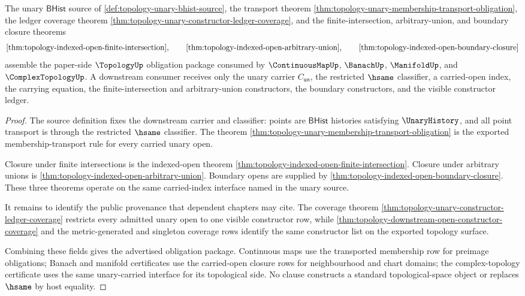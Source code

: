 \begin{theorem}
\label{thm:topology-deps-ready-obligation-package}
The unary $\mathsf{BHist}$ source of \autoref{def:topology-unary-bhist-source}, the transport theorem \autoref{thm:topology-unary-membership-transport-obligation}, the ledger coverage theorem \autoref{thm:topology-unary-constructor-ledger-coverage}, and the finite-intersection, arbitrary-union, and boundary closure theorems
$$
\autoref{thm:topology-indexed-open-finite-intersection},\qquad
\autoref{thm:topology-indexed-open-arbitrary-union},\qquad
\autoref{thm:topology-indexed-open-boundary-closure}
$$
assemble the paper-side $\TopologyUp$ obligation package consumed by $\ContinuousMapUp$, $\BanachUp$, $\ManifoldUp$, and $\ComplexTopologyUp$. A downstream consumer receives only the unary carrier $C_{\mathsf{un}}$, the restricted $\hsame$ classifier, a carried-open index, the carrying equation, the finite-intersection and arbitrary-union constructors, the boundary constructors, and the visible constructor ledger.
\end{theorem}
\begin{proof}
The source definition fixes the downstream carrier and classifier: points are $\mathsf{BHist}$ histories satisfying $\UnaryHistory$, and all point transport is through the restricted $\hsame$ classifier. The theorem \autoref{thm:topology-unary-membership-transport-obligation} is the exported membership-transport rule for every carried unary open.

Closure under finite intersections is the indexed-open theorem \autoref{thm:topology-indexed-open-finite-intersection}. Closure under arbitrary unions is \autoref{thm:topology-indexed-open-arbitrary-union}. Boundary opens are supplied by \autoref{thm:topology-indexed-open-boundary-closure}. These three theorems operate on the same carried-index interface named in the unary source.

It remains to identify the public provenance that dependent chapters may cite. The coverage theorem \autoref{thm:topology-unary-constructor-ledger-coverage} restricts every admitted unary open to one visible constructor row, while \autoref{thm:topology-downstream-open-constructor-coverage} and the metric-generated and singleton coverage rows identify the same constructor list on the exported topology surface.

Combining these fields gives the advertised obligation package. Continuous maps use the transported membership row for preimage obligations; Banach and manifold certificates use the carried-open closure rows for neighbourhood and chart domains; the complex-topology certificate uses the same unary-carried interface for its topological side. No clause constructs a standard topological-space object or replaces $\hsame$ by host equality.
\end{proof}

